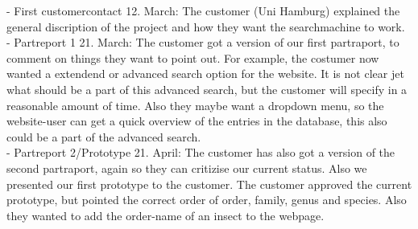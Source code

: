 \documentclass[12pt,a4paper]{article}
\begin{document}
	- First customercontact 12. March: The customer (Uni Hamburg) explained the general discription of the project and how they want the searchmachine to work. \\
	
	- Partreport 1 21. March: The customer got a version of our first partraport, to comment on things they want to point out. For example, the costumer now wanted a extendend or advanced search option for the website. It is not clear jet what should be a part of this advanced search, but the customer will specify in a reasonable amount of time. Also they maybe want a dropdown menu, so the website-user can get a quick overview of the entries in the database, this also could be a part of the advanced search.\\
	
	- Partreport 2/Prototype 21. April: The customer has also got a version of the second partraport, again so they can critizise our current status. Also we presented our first prototype to the customer. The customer approved the current prototype, but pointed the correct order of order, family, genus and species. Also they wanted to add the order-name of an insect to the webpage.
\end{document}

